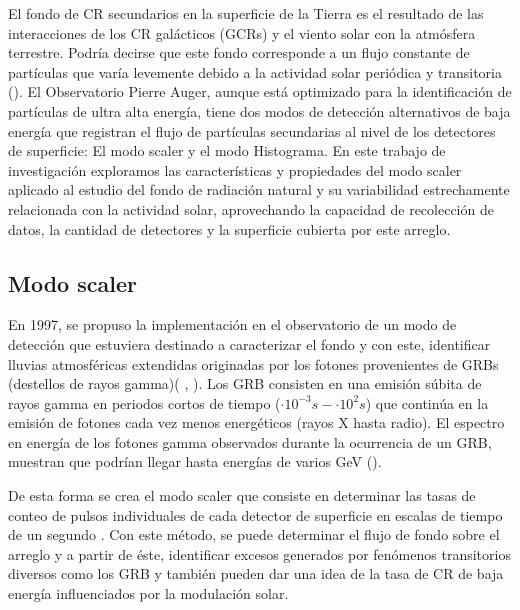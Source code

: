 El fondo de CR secundarios en la superficie de la Tierra es el resultado de las interacciones de los CR galácticos (GCRs) y el viento solar con la atmósfera terrestre. Podría decirse que este fondo corresponde a un flujo constante de partículas que varía levemente debido a la actividad solar periódica y transitoria (\cite{masias_2017}). El Observatorio Pierre Auger, aunque está optimizado para la identificación de partículas de ultra alta energía, tiene dos modos de detección alternativos de baja energía que registran el flujo de partículas secundarias al nivel de los detectores de superficie: El modo scaler y el modo Histograma. En  este trabajo de investigación exploramos las características y propiedades del modo scaler aplicado al estudio del fondo de radiación natural y su variabilidad estrechamente relacionada con la actividad solar, aprovechando la capacidad de recolección de datos, la cantidad de detectores y la superficie cubierta por este arreglo.

\subsection{Modo scaler}

En 1997, se propuso la implementación en el observatorio de un modo de detección que estuviera destinado a caracterizar el fondo y  con este, identificar lluvias atmosféricas extendidas originadas por los fotones provenientes de GRBs (destellos de rayos gamma)(\cite{asorey_2012} , \cite{bertou_2011}). Los GRB consisten en una emisión súbita de rayos gamma en periodos cortos de tiempo ($\cdot 10^{-3}s - \cdot 10^{2}s$) que continúa en la emisión de fotones cada vez menos energéticos (rayos X hasta radio). El espectro en energía de los fotones gamma observados durante la ocurrencia de un GRB, muestran que podrían llegar hasta energías de varios GeV (\cite{Bernlöhr_1996}).

De esta forma se crea el modo scaler que consiste en determinar las tasas de conteo de pulsos individuales de cada detector de superficie en escalas de tiempo de un segundo \cite{asorey_2012}. Con este método, se puede determinar el flujo de fondo sobre el arreglo y a partir de éste, identificar excesos generados por fenómenos transitorios diversos como los GRB y también pueden dar una idea de la tasa de CR de baja energía influenciados por la modulación solar.


